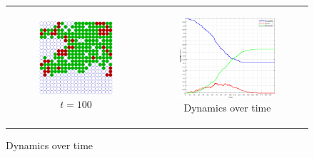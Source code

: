 \begin{figure}
\begin{center}
	\begin{tabular}{c c}
		\begin{subfigure}[b]{0.2\textwidth}
			\centering
			\includegraphics[width=1\textwidth, angle=0]{./fig/step5_environment/SIR_environment_30x30agents_t100_01dt.png}
			\caption{$t = 100$}
			\label{fig:sir_env_t100}
		\end{subfigure}
    	
    	&
  
		\begin{subfigure}[b]{0.23\textwidth}
			\centering
			\includegraphics[width=1\textwidth, angle=0]{./fig/step5_environment/SIR_dynamics_30x30agents_300t_01dt.png}
			\caption{Dynamics over time}
			\label{fig:sir_dynamics_30x30agents_300t_01dt}
		\end{subfigure}
	\end{tabular}
	

\end{center}
\end{figure}
